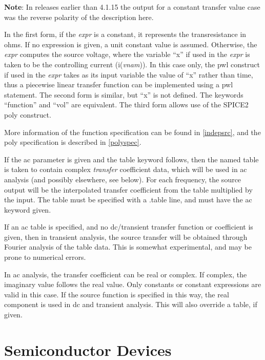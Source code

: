 {\bf Note}:  In releases earlier than 4.1.15 the output for a constant
transfer value case was the reverse polarity of the description here.

In the first form, if the {\it expr} is a constant, it represents the
transresistance in ohms.  If no expression is given, a unit constant
value is assumed.  Otherwise, the {\it expr} computes the source
voltage, where the variable ``{\vt x}'' if used in the {\it expr} is
taken to be the controlling current (i({\it vnam\/})).  In this case
only, the {\vt pwl} construct if used in the {\it expr} takes as its
input variable the value of ``{\vt x}'' rather than time, thus a
piecewise linear transfer function can be implemented using a {\vt
pwl} statement.  The second form is similar, but ``{\vt x}'' is not
defined.  The keywords ``{\vt function}'' and ``{\vt vol}'' are
equivalent.  The third form allows use of the SPICE2 {\vt poly}
construct.

More information of the function specification can be found in
\ref{indepsrc}, and the {\vt poly} specification is described in
\ref{polyspec}.

If the {\vt ac} parameter is given and the {\vt table} keyword
follows, then the named table is taken to contain complex {\it
transfer} coefficient data, which will be used in ac analysis (and
possibly elsewhere, see below).  For each frequency, the source output
will be the interpolated transfer coefficient from the table
multiplied by the input.  The table must be specified with a {\vt
.table} line, and must have the {\vt ac} keyword given.

If an ac table is specified, and no dc/transient transfer function or
coefficient is given, then in transient analysis, the source transfer
will be obtained through Fourier analysis of the table data.  This is
somewhat experimental, and may be prone to numerical errors.

In ac analysis, the transfer coefficient can be real or complex.  If
complex, the imaginary value follows the real value.  Only constants
or constant expressions are valid in this case.  If the source
function is specified in this way, the real component is used in dc
and transient analysis.  This will also override a table, if given.


\section{Semiconductor Devices}

